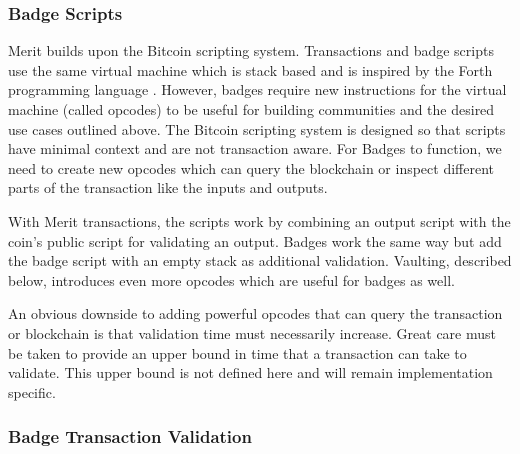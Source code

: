 \documentclass{article}
\begin{document}
\subsubsection{Badge Scripts}

Merit builds upon the Bitcoin scripting system. Transactions and badge scripts use
the same virtual machine which is stack based and is inspired by the Forth programming
language \cite{scripts}. However, badges require new instructions for the virtual
machine (called opcodes) to be useful for building communities and the desired
use cases outlined above. The Bitcoin scripting system is designed so that scripts
have minimal context and are not transaction aware. For Badges to function, we
need to create new opcodes which can query the blockchain or inspect different
parts of the transaction like the inputs and outputs.

\begin{center}
\end{center}

With Merit transactions, the scripts work by combining an output script with the
coin's public script for validating an output. Badges work the same way but add
the badge script with an empty stack as additional validation. Vaulting, described
below, introduces even more opcodes which are useful for badges as well.

An obvious downside to adding powerful opcodes that can query the transaction or
blockchain is that validation time must necessarily increase. Great care must
be taken to provide an upper bound in time that a transaction can take to validate.
This upper bound is not defined here and will remain implementation specific. 

\subsubsection{Badge Transaction Validation}
\end{document}
